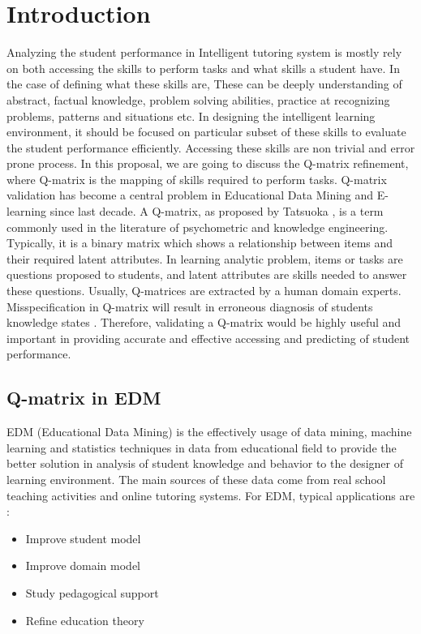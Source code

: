 \documentclass[12pt]{article}
\begin{document}
\section{Introduction}

  Analyzing the student performance in Intelligent tutoring system is mostly rely on both accessing the skills to perform tasks and what skills a student have. In the case of defining what these skills are, These can be deeply understanding of abstract, factual knowledge, problem solving abilities, practice at recognizing problems, patterns and situations etc. In designing the intelligent learning environment, it should be focused on particular subset of these skills to evaluate the student performance efficiently. Accessing these skills are non trivial and error prone process. In this proposal, we are going to discuss the Q-matrix  refinement, where Q-matrix is the mapping of skills required to perform tasks. Q-matrix validation has become a central problem in Educational Data Mining and E-learning since last decade. A Q-matrix, as proposed by Tatsuoka \cite{tatsuoka1983rule}, is a term commonly used in the literature of psychometric and knowledge engineering. Typically, it is a binary matrix which shows a relationship between items and their required latent attributes. In learning analytic problem, items or tasks are questions proposed to students, and latent attributes are skills needed to answer these questions. Usually, Q-matrices are extracted by a human domain experts. Misspecification in Q-matrix will result in erroneous diagnosis of students knowledge states \cite{rupp2008effects,madison2015effects}. Therefore, validating a Q-matrix would be highly useful and important in providing accurate and effective accessing and predicting of student performance. 
	\subsection{Q-matrix in EDM}
 EDM (Educational Data Mining) is the effectively usage of data mining, machine learning and statistics techniques in data from educational field to provide the better solution in analysis of student knowledge and behavior to the designer of learning environment. The main sources of these data come from real school teaching activities and online tutoring systems. For EDM, typical applications are \cite{baker2009state}: 
\begin{itemize}
	\item{Improve student model}
	\item{Improve domain model}
	\item{Study pedagogical support}
	\item{Refine education theory}
\end{itemize}
\end{document}

